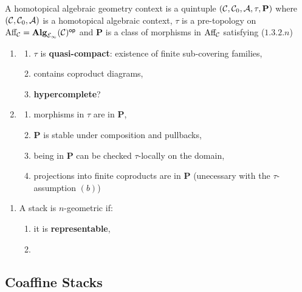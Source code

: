 \documentclass{article}
\begin{document}
\begin{definition}
    A homotopical algebraic geometry context is a quintuple $(\mathcal{C}, \mathcal{C}_0, \mathcal{A}, \tau, \mathbf{P})$ where $(\mathcal{C}, \mathcal{C}_0, \mathcal{A})$ is a homotopical algebraic context, $\tau$ is a pre-topology on $\textnormal{Aff}_{\mathcal{C}} = \mathbf{Alg}_{\mathcal{E}_{\infty}}(\mathcal{C})^{\mathsf{op}}$ and $\mathbf{P}$ is a class of morphisms in $\textnormal{Aff}_{\mathcal{C}}$ satisfying ($1.3.2.n$)
    \begin{enumerate}
        \item[$(2)$]
        \begin{enumerate}
            \item $\tau$ is \textbf{quasi-compact}: existence of finite sub-covering families,
            \item contains coproduct diagrams,
            \item \textbf{hypercomplete}?
        \end{enumerate}
        
        \item[$(11)$]
        \begin{enumerate}
            \item morphisms in $\tau$ are in $\mathbf{P}$,
            \item $\mathbf{P}$ is stable under composition and pullbacks,
            \item being in $\mathbf{P}$ can be checked $\tau$-locally on the domain,
            \item projections into finite coproducts are in $\mathbf{P}$ (unecessary with the $\tau$-assumption $(b)$)
        \end{enumerate}
    \end{enumerate}
\end{definition}

\begin{definition}\leavevmode
\begin{enumerate}[label = $\bullet$]
    \item A stack is $n$-geometric if:
    \begin{enumerate}
        \item[$(n=-1)$] it is \textbf{representable},
        \item[$(n\geq 0)$] 
    \end{enumerate}
\end{enumerate}
\end{definition}

\subsection{Coaffine Stacks}
\end{document}
